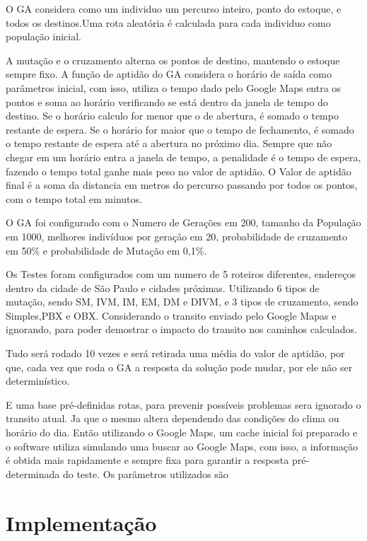 O GA considera como um individuo um percurso inteiro, ponto do estoque, e todos os destinos.Uma rota aleatória é calculada para cada individuo como população inicial.

A mutação e o cruzamento alterna os pontos de destino, mantendo o estoque sempre fixo.
A função de aptidão do GA considera o horário de saída como parâmetros inicial, com isso, utiliza o tempo dado pelo Google Maps entra os pontos e soma ao horário verificando se está dentro da janela de tempo do destino. Se o horário calculo for menor que o de abertura, é somado o tempo restante de espera. Se o horário for maior que o tempo de fechamento, é somado o tempo restante de espera até a abertura no próximo dia. Sempre que não chegar em um horário entra a janela de tempo, a penalidade é o tempo de espera, fazendo o tempo total ganhe mais peso no valor de aptidão. O Valor de aptidão final é a soma da distancia em metros do percurso passando por todos os pontos, com o tempo total em minutos.

O GA foi configurado com o Numero de Gerações em 200, tamanho da População em 1000, melhores indivíduos por geração em 20, probabilidade de cruzamento em 50\% e probabilidade de Mutação em 0,1\%.

Os Testes foram configurados com um numero de 5 roteiros diferentes, endereços dentro da cidade de São Paulo e cidades próximas. Utilizando 6 tipos de mutação, sendo SM, IVM, IM, EM, DM e DIVM, e 3 tipos de cruzamento, sendo Simples,PBX e OBX.
Considerando o transito enviado pelo Google Mapas e ignorando, para poder demostrar o impacto do transito nos caminhos calculados.

Tudo será rodado 10 vezes e será retirada uma média do valor de aptidão, por que, cada vez que roda o GA a resposta da solução pode mudar, por ele não ser determinístico.

E uma base pré-definidas rotas, para prevenir possíveis problemas sera ignorado o transito atual. Ja que o mesmo altera dependendo das condições do clima ou horário do dia. Então utilizando o Google Maps, um cache inicial foi preparado e o software utiliza simulando uma buscar ao Google Maps, com isso, a informação é obtida mais rapidamente e sempre fixa para garantir a resposta pré-determinada do teste.
Os parâmetros utilizados são


\chapter{Implementação}
 
